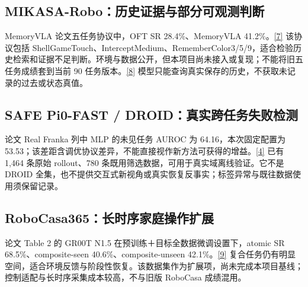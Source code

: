 \documentclass[UTF8,11pt,a4paper,fontset=none]{ctexart}
\begin{document}
\subsection{MIKASA-Robo：历史证据与部分可观测判断}
MemoryVLA 论文五任务协议中，OFT SR 28.4\%、MemoryVLA 41.2\%。\href{https://arxiv.org/html/2508.19236v2}{[7]} 该协议包括 ShellGameTouch、InterceptMedium、RememberColor3/5/9，适合检验历史检索和证据不足判断。环境与数据公开，但本项目尚未接入或复现；不能将旧五任务成绩套到当前 90 任务版本。\href{https://github.com/CognitiveAISystems/MIKASA-Robo}{[8]} 模型只能查询真实保存的历史，不获取未记录的过去或状态真值。

\subsection{SAFE Pi0-FAST / DROID：真实跨任务失败检测}
论文 Real Franka 列中 MLP 的未见任务 AUROC 为 64.16，本次固定配置为 53.53；该差距含调优协议差异，不能直接视作新方法可获得的增益。\href{https://arxiv.org/html/2506.09937v2}{[4]} 已有 1,464 条原始 rollout、780 条既用筛选数据，可用于真实域离线验证。它不是 DROID 全集，也不提供交互式新视角或真实恢复反事实；标签异常与既往数据使用须保留记录。

\subsection{RoboCasa365：长时序家庭操作扩展}
论文 Table 2 的 GR00T N1.5 在预训练＋目标全数据微调设置下，atomic SR 68.5\%、composite-seen 40.6\%、composite-unseen 42.1\%。\href{https://arxiv.org/html/2603.04356}{[9]} 复合任务仍有明显空间，适合环境反馈与阶段性恢复。该数据集作为扩展项，尚未完成本项目基线；控制适配与长时序采集成本较高，不与旧版 RoboCasa 成绩混用。
\end{document}
